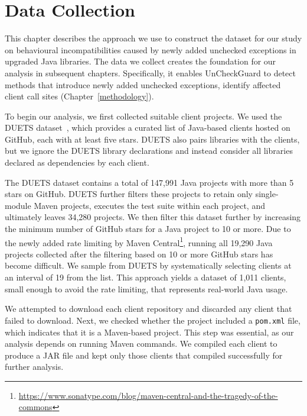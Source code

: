 \chapter{Data Collection}\label{data}

This chapter describes the approach we use to construct the dataset for our study on behavioural incompatibilities caused by newly added unchecked exceptions in upgraded Java libraries. The data we collect creates the foundation for our analysis in subsequent chapters. Specifically, it enables UnCheckGuard to detect methods that introduce newly added unchecked exceptions, identify affected client call sites (Chapter~\ref{methodology}).


To begin our analysis, we first collected suitable client projects. We used the DUETS dataset~\cite{durieux21:_duets}, which provides a curated list of Java-based clients hosted on GitHub, each with at least five stars. DUETS also pairs libraries with the clients, but we ignore the DUETS library declarations and instead consider all libraries declared as dependencies by each client.

The DUETS dataset contains a total of 147,991 Java projects with more than 5 stars on GitHub. DUETS further filters these projects to retain only single-module Maven projects, executes the test suite within each project, and ultimately leaves 34,280 projects. We then filter this dataset further by increasing the minimum number of GitHub stars for a Java project to 10 or more. Due to the newly added rate limiting by Maven Central\footnote{\url{https://www.sonatype.com/blog/maven-central-and-the-tragedy-of-the-commons}}, running all 19,290 Java projects collected after the filtering based on 10 or more GitHub stars has become difficult. We sample from DUETS by systematically selecting clients at an interval of 19 from the list. This approach yields a dataset of 1,011 clients, small enough to avoid the rate limiting, that represents real-world Java usage.

We attempted to download each client repository and discarded any client that failed to download.
Next, we checked whether the project included a \texttt{pom.xml} file, which indicates that it is a Maven-based project. This step was essential, as our analysis depends on running Maven commands. We compiled each client to produce a JAR file and kept only those clients that compiled successfully for further analysis.